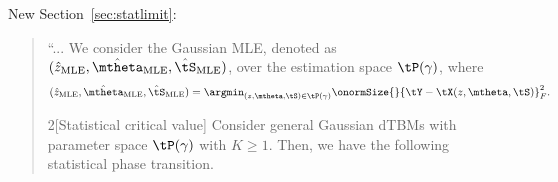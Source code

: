 \documentclass[11pt]{article}
\theoremstyle{definition}
\theoremstyle{definition}
\newtheorem{rmk}{Remark}
\begin{document}
\begin{enumerate}[wide, labelwidth=!, labelindent=0pt]



New Section~\ref{sec:statlimit}:

\begin{quote}
``... We consider the Gaussian MLE, denoted as $(\hat z_{\text{MLE}}, \hat \mtheta_{\text{MLE}}, \hat \tS_{\text{MLE}})$, over the estimation space $\tP(\gamma)$, where 
\begin{equation}\label{eq:mle}
    (\hat z_{\text{MLE}}, \hat \mtheta_{\text{MLE}}, \hat \tS_{\text{MLE}}) = \argmin_{ (z, \mtheta, \tS) \in \tP (\gamma)} \onormSize{}{\tY - \tX(z,\mtheta, \tS)}_F^2.
\end{equation}

\begin{customthm}{2}[Statistical critical value] Consider general Gaussian dTBMs with parameter space $\tP(\gamma)$ with $K\geq 1$. Then, we have the following statistical phase transition. 


\end{customthm}
\end{quote}
\end{enumerate}
\end{document}
